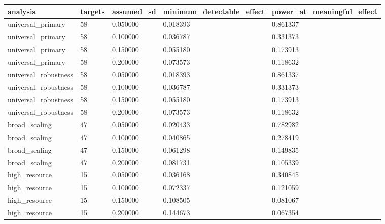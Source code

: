 \begin{tabular}{lllll}
\toprule
analysis & targets & assumed\_sd & minimum\_detectable\_effect & power\_at\_meaningful\_effect \\
\midrule
universal\_primary & 58 & 0.050000 & 0.018393 & 0.861337 \\
universal\_primary & 58 & 0.100000 & 0.036787 & 0.331373 \\
universal\_primary & 58 & 0.150000 & 0.055180 & 0.173913 \\
universal\_primary & 58 & 0.200000 & 0.073573 & 0.118632 \\
universal\_robustness & 58 & 0.050000 & 0.018393 & 0.861337 \\
universal\_robustness & 58 & 0.100000 & 0.036787 & 0.331373 \\
universal\_robustness & 58 & 0.150000 & 0.055180 & 0.173913 \\
universal\_robustness & 58 & 0.200000 & 0.073573 & 0.118632 \\
broad\_scaling & 47 & 0.050000 & 0.020433 & 0.782982 \\
broad\_scaling & 47 & 0.100000 & 0.040865 & 0.278419 \\
broad\_scaling & 47 & 0.150000 & 0.061298 & 0.149835 \\
broad\_scaling & 47 & 0.200000 & 0.081731 & 0.105339 \\
high\_resource & 15 & 0.050000 & 0.036168 & 0.340845 \\
high\_resource & 15 & 0.100000 & 0.072337 & 0.121059 \\
high\_resource & 15 & 0.150000 & 0.108505 & 0.081067 \\
high\_resource & 15 & 0.200000 & 0.144673 & 0.067354 \\
\bottomrule
\end{tabular}
